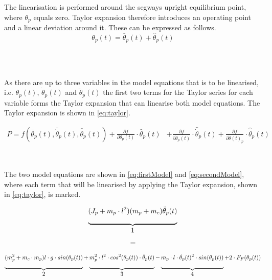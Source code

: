 The linearisation is performed around the segways upright equilibrium point, where $\theta_p$ equals zero. Taylor expansion therefore introduces an operating point and a linear deviation around it. These can be expressed as follows.
\begin{equation}
\theta_p(t) = \bar{\theta}_p(t) + \hat{\theta}_p(t)
\end{equation}
\begin{where}
\\
\\
\end{where}

As there are up to three variables in the model equations that is to be linearised, i.e. $\theta_p(t)$, $\dot\theta_p(t)$ and $\ddot\theta_p(t)$ the first two terms for the Taylor series for each variable forms the Taylor expansion that can linearise both model equations. The Taylor expansion is shown in \autoref{eq:taylor}.

\begin{align}
P= f(\bar{\theta}_p(t),\bar{\dot \theta}_p(t),\bar{\ddot \theta}_p(t))+ \frac{\partial f}{\partial\theta_p(t)}\cdot \hat{\theta}_p(t)&+\frac{\partial f}{\partial \dot \theta_p(t)}\cdot \hat{\dot \theta}_p(t)+ \frac{\partial f}{\partial \ddot \theta(t)_p}\cdot \hat{\ddot \theta}_p(t)\label{eq:taylor}
\end{align}
\begin{where}
\\
\end{where}


The two model equations are shown in \autoref{eq:firstModel} and \autoref{eq:secondModel}, where each term that will be linearised by applying the Taylor expansion, shown in \autoref{eq:taylor}, is marked. 

\begin{align*}
\underbrace{(J_p + m_p \cdot l^2)(m_p + m_c)\ddot \theta_p(t)\rule[-12pt]{0pt}{5pt}}_{\mbox{1}}
\end{align*}
\vspace{-1.1 cm}
\begin{align*}
\\
=
\\
\end{align*}
\vspace{-1.1 cm}
\begin{align}
\underbrace{(m_p^2 + m_c \cdot m_p)l \cdot g \cdot sin(\theta_p(t))\rule[-12pt]{0pt}{5pt}}_{\mbox{2}} + \underbrace{m_p^2 \cdot l^2 \cdot cos^2(\theta_p(t)) \cdot \ddot \theta_p(t)\rule[-12pt]{0pt}{5pt}}_{\mbox{3}} - \underbrace{m_p \cdot l \cdot \dot \theta_p(t)^2 \cdot sin(\theta_p(t))\rule[-12pt]{0pt}{5pt}}_{\mbox{4}} + 2 \cdot F_F(\theta_p(t))
\label{eq:firstModel}
\end{align}

